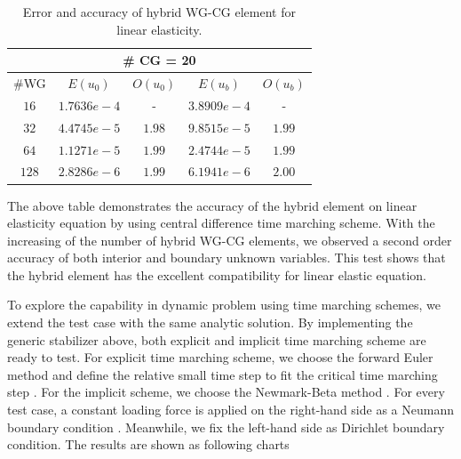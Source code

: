       \begin{table}[h]
      	\setlength{\tabcolsep}{2pt} {
      		\caption{ Error and accuracy of hybrid WG-CG element for linear elasticity.}
      		\label{Tab:hwgcg l1}
      		\vspace{-5pt}
      		\begin{center}
      			\begin{tabular}{c|c|c|c|c}
      				\hline
      				\multicolumn{5}{c}{\# CG = 20} \\
      				\hline
      				\#WG & $ E (u_{0}) $ & $ O(u_{0}) $ & $ E(u_{b})  $& $ O(u_{b})  $\\
      				\hline
      				$ 16 $ & $ 1.7636e-4 $ & - & $ 3.8909e-4 $ & - \\
      				\hline
      				$ 32 $ & $ 4.4745e-5 $ & $ 1.98 $& $ 9.8515e-5 $ & $ 1.99 $ \\
      				\hline
      				$ 64 $ & $ 1.1271e-5 $ & $ 1.99 $ & $ 2.4744e-5 $ & $ 1.99 $ \\
      				\hline
      				$ 128 $ & $ 2.8286e-6 $ & $ 1.99 $ & $ 6.1941e-6 $ & $ 2.00 $\\
      				\hline
      			\end{tabular}
      		\end{center} }
      	\end{table}
      	
      	The above table demonstrates the accuracy of the hybrid element on linear elasticity equation by using central difference time marching scheme.
      	With the increasing of the number of hybrid WG-CG elements, we observed a second order accuracy of both interior and boundary unknown variables. This test shows that the hybrid element has the excellent compatibility for linear elastic equation.
      	
      	To explore the capability in dynamic problem using time marching schemes, we extend the test case with the same analytic solution. By implementing the generic stabilizer above, both explicit and implicit time marching scheme are ready to test. For explicit time marching scheme, we choose the forward Euler method \cite{jameson1991time} and define the relative small time step to fit the critical time marching step \cite{cundall1979discrete}. For the implicit scheme, we choose the Newmark-Beta method \cite{hahn1991modified}. For every test case, a constant loading force is applied on the right-hand side as a Neumann boundary condition \cite{ng1999fast}. Meanwhile, we fix the left-hand side as Dirichlet boundary condition. The results are shown as following charts
      	
